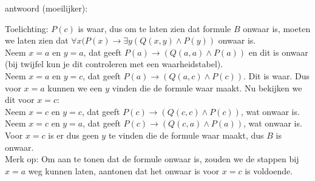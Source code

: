 \begin{answer}
\begin{enumerate}[label=\textit{\alph*.}]
antwoord (moeilijker):
\begin{center}
\end{center}
Toelichting: $P(c)$ is waar, dus om te laten zien dat formule $B$ onwaar is,  moeten we laten zien dat $\forall x(P(x)\rightarrow\exists y(Q(x,y)\wedge P(y))$ onwaar is. \\
Neem $x = a$ en $y = a$,  dat geeft $P(a) \rightarrow (Q(a,a) \wedge P(a))$ en dit is onwaar (bij twijfel kun je dit controleren met een waarheidstabel).\\
Neem $x = a$ en $y = c$,  dat geeft $P(a) \rightarrow (Q(a,c) \wedge P(c))$.   Dit is waar.  Dus voor $x = a$ kunnen we een $y$ vinden die de formule waar maakt.  Nu bekijken we dit voor $x = c$:\\
Neem $x= c$ en $y = c$,  dat geeft $P(c) \rightarrow (Q(c,c) \wedge P(c))$, wat onwaar is. \\
Neem $x =c$ en $y=a$, dat geeft $P(c) \rightarrow (Q(c,a) \wedge P(a))$,  wat onwaar is. \\
Voor $x=c$ is er dus geen $y$ te vinden die de formule waar maakt,  dus $B$ is onwaar.\\
Merk op: Om aan te tonen dat de formule onwaar is,  zouden we de stappen bij $x=a$ weg kunnen laten,  aantonen dat het onwaar is voor $x=c$ is voldoende.  


\end{enumerate}
\end{answer}
